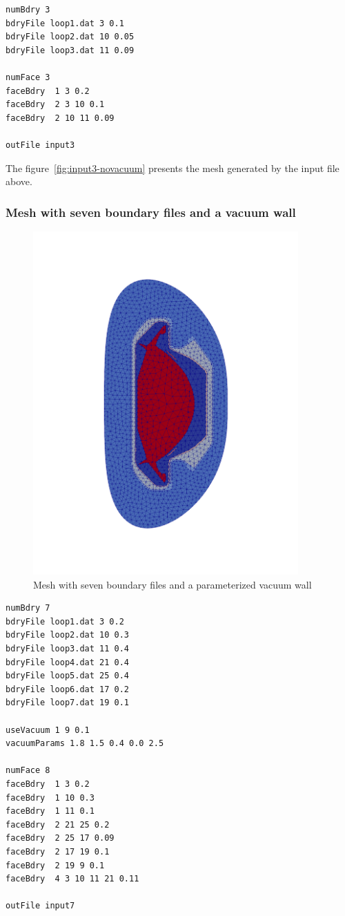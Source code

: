 \begin{verbatim}
numBdry 3
bdryFile loop1.dat 3 0.1
bdryFile loop2.dat 10 0.05
bdryFile loop3.dat 11 0.09

numFace 3
faceBdry  1 3 0.2
faceBdry  2 3 10 0.1
faceBdry  2 10 11 0.09

outFile input3
\end{verbatim}

The figure~\ref{fig:input3-novacuum} presents the mesh generated by the input file above.

\subsubsection{Mesh with seven boundary files and a vacuum wall}

\begin{figure}
\centering
\includegraphics[width=4in]{./figures/meshgen-input7.pdf}
\caption{Mesh with seven boundary files and a parameterized vacuum wall}
\label{fig:input7-vacuum}
\end{figure}

\begin{verbatim}
numBdry 7
bdryFile loop1.dat 3 0.2
bdryFile loop2.dat 10 0.3
bdryFile loop3.dat 11 0.4
bdryFile loop4.dat 21 0.4
bdryFile loop5.dat 25 0.4
bdryFile loop6.dat 17 0.2
bdryFile loop7.dat 19 0.1

useVacuum 1 9 0.1
vacuumParams 1.8 1.5 0.4 0.0 2.5

numFace 8
faceBdry  1 3 0.2
faceBdry  1 10 0.3
faceBdry  1 11 0.1
faceBdry  2 21 25 0.2
faceBdry  2 25 17 0.09
faceBdry  2 17 19 0.1
faceBdry  2 19 9 0.1
faceBdry  4 3 10 11 21 0.11

outFile input7
\end{verbatim}

